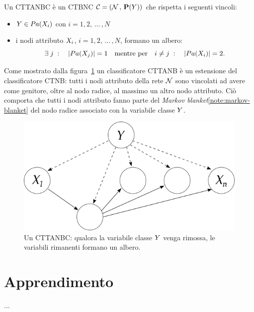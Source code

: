 \begin{definizione}\label{defn:cttanbc}
Un \acf{CTTANBC} è un \acl{CTBNC} $\mathcal{C}=(\mathcal{N}\,,\,\mathbf{P}(\mathnormal{Y}))$ che rispetta i seguenti vincoli:
\begin{itemize}
    \item $\mathnormal{Y} \in Pa(\mathnormal{X}_i)$ con $i=1,2,\,\dotsc\,,N$
    \item i nodi attributo $\mathnormal{X}_i$, $i=1,2,\,\dotsc\,,N$, formano un albero:
    \[
    \exists \; j \; : \quad |Pa(\mathnormal{X}_j)|=1 \quad \text{mentre per} \quad i \neq j \; : \quad |Pa(\mathnormal{X}_i)|=2\text{.}
    \]
\end{itemize}
\end{definizione}
Come mostrato dalla figura~\ref{fig:cttanbc} un classificatore \acs{CTTANB} è un estensione del classificatore \acs{CTNB}: tutti i nodi attributo della rete $\mathcal{N}$ sono vincolati ad avere come genitore, oltre al nodo radice, al massimo un altro nodo attributo. Ciò comporta che tutti i nodi attributo fanno parte del \emph{Markov blanket}\cref{note:markov-blanket} del nodo radice associato con la variabile classe $\mathnormal{Y}$.

\begin{figure}
\centering
\includegraphics[width=0.9\columnwidth]{immagini/cttanb}
\caption[Un \acs{CTTANBC}]{Un \acf{CTTANBC}: qualora la variabile classe $\mathnormal{Y}$ venga rimossa, le variabili rimanenti formano un albero.}
\label{fig:cttanbc}
\end{figure}

\section{Apprendimento}\label{sec:learning-ctbnc}
...


